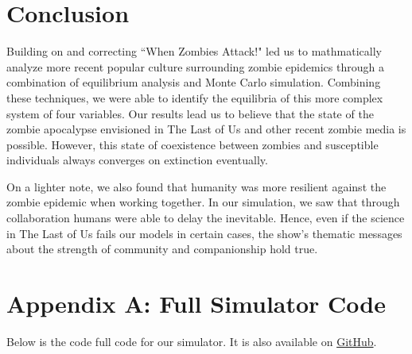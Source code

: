 \documentclass{article}
\begin{document}
\section{Conclusion}

Building on and correcting ``When Zombies Attack!" led us to mathmatically analyze more recent popular culture surrounding zombie epidemics through a combination of equilibrium analysis and Monte Carlo simulation. Combining these techniques, we were able to identify the equilibria of this more complex system of four variables. Our results lead us to believe that the state of the zombie apocalypse envisioned in The Last of Us and other recent zombie media is possible. However, this state of coexistence between zombies and susceptible individuals always converges on extinction eventually.

On a lighter note, we also found that humanity was more resilient against the zombie epidemic when working together. In our simulation, we saw that through collaboration humans were able to delay the inevitable. Hence, even if the science in The Last of Us fails our models in certain cases, the show's thematic messages about the strength of community and companionship hold true.

\clearpage
\section{Appendix A: Full Simulator Code}

Below is the code full code for our simulator. It is also available on \href{https://github.com/cphalen/math2100-final-project}{GitHub}.
\end{document}
